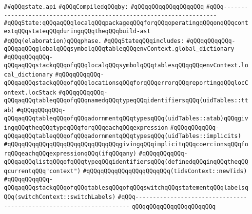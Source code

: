 \label{src/lib/c-kit/src/ast/state.api}
\verb|##qQQqstate.api|\newline
\newline
\verb|#qQQqCompiledqQQqby:|\newline
\verb|#qQQqqQQqqQQqqQQqqQQq|\newline
\newline
\verb|#qQQq--------------------------------------------------------------------|\newline
\verb|#qQQqState:qQQqaqQQqlocalqQQqpackageqQQqforqQQqoperatingqQQqonqQQqcontextqQQqstateqQQqduringqQQqtheqQQqbuild-ast|\newline
\verb|#qQQq(elaboration)qQQqphase.|\newline
\verb|#qQQqStateqQQqincludes:|\newline
\verb|#qQQqqQQqqQQq-qQQqaqQQqglobalqQQqsymbolqQQqtableqQQqenvContext.global_dictionary|\newline
\verb|#qQQqqQQqqQQq-qQQqaqQQqstackqQQqofqQQqlocalqQQqsymbolqQQqtablesqQQqqQQqenvContext.local_dictionary|\newline
\verb|#qQQqqQQqqQQq-qQQqaqQQqstackqQQqofqQQqlocationsqQQqforqQQqerrorqQQqreportingqQQqlocContext.locStack|\newline
\verb|#qQQqqQQqqQQq-qQQqaqQQqtableqQQqofqQQqnamedqQQqtypeqQQqidentifiersqQQq(uidTables::ttab)|\newline
\verb|#qQQqqQQqqQQq-qQQqaqQQqtableqQQqofqQQqadornmentqQQqtypesqQQq(uidTables::atab)qQQqgivingqQQqtheqQQqtypeqQQqforqQQqeachqQQqexpression|\newline
\verb|#qQQqqQQqqQQq-qQQqaqQQqtableqQQqofqQQqadornmentqQQqtypesqQQq(uidTables::implicits)|\newline
\verb|#qQQqqQQqqQQqqQQqqQQqqQQqqQQqqQQqgivingqQQqimplicitqQQqcoercionsqQQqforqQQqeachqQQqexpressionqQQq(ifqQQqany)|\newline
\verb|#qQQqqQQqqQQq-qQQqaqQQqlistqQQqofqQQqtypeqQQqidentifiersqQQq(definedqQQqinqQQqtheqQQqcurrentqQQq"context")|\newline
\verb|#qQQqqQQqqQQqqQQqqQQqqQQq(tidsContext::newTids)|\newline
\verb|#qQQqqQQqqQQq-qQQqaqQQqstackqQQqofqQQqtablesqQQqofqQQqswitchqQQqstatementqQQqlabelsqQQq(switchContext::switchLabels)|\newline
\verb|#qQQq--------------------------------------------------------------------|\newline
\newline
\verb|qQQqqQQqqQQqqQQqqQQqqQQq|\newline
